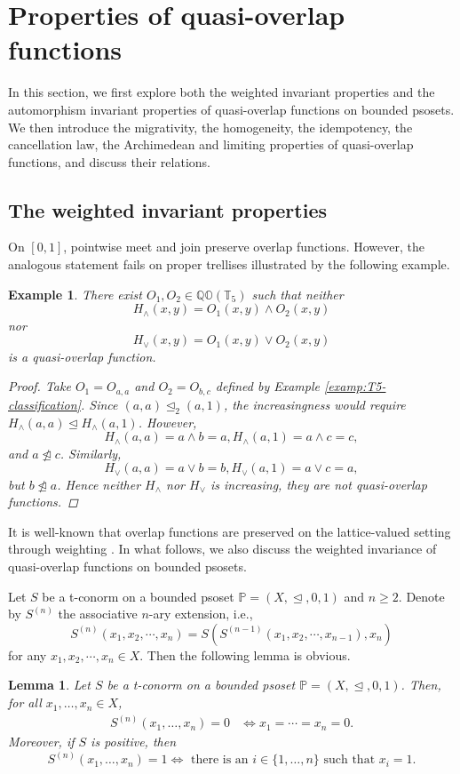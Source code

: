 \documentclass[preprint,12pt]{elsarticle}
\newtheorem{lemma}[theorem]{Lemma}
\newtheorem{example}[theorem]{Example}
\begin{document}
\section{Properties of quasi-overlap functions}\label{sec:properties}
In this section, we first explore both the weighted invariant properties and the automorphism invariant properties of quasi-overlap functions on bounded psosets. We then introduce the migrativity, the homogeneity, the idempotency, the cancellation law, the Archimedean and limiting properties of quasi-overlap functions, and discuss their relations.
\subsection{The weighted invariant properties}

On $[0,1]$, pointwise meet and join preserve overlap functions. However, the analogous statement fails on proper trellises illustrated by the following example.
\begin{example}\label{ex:pointwise-failure}
There exist $O_1,O_2\in\mathbb{QO}(\mathbb{T}_5)$ such that neither
$$
 H_\wedge(x,y)=O_1(x,y)\wedge O_2(x,y)
$$
nor
$$
 H_\vee(x,y)=O_1(x,y)\vee O_2(x,y)
$$
is a quasi-overlap function.

\begin{proof}
Take $O_1=O_{a,a}$ and $O_2=O_{b,c}$ defined by Example \ref{examp:T5-classification}.
Since $(a,a)\trianglelefteq_2(a,1)$, the increasingness would require $H_\wedge(a,a)\trianglelefteq H_\wedge(a,1)$. However,
$$
 H_\wedge(a,a)=a\wedge b=a,
 H_\wedge(a,1)=a\wedge c=c,
$$
and $a\ntrianglelefteq c$. Similarly,
$$
 H_\vee(a,a)=a\vee b=b,
 H_\vee(a,1)=a\vee c=a,
$$
but $b\ntrianglelefteq a$. Hence neither $H_\wedge$ nor $H_\vee$ is increasing, they are not quasi-overlap functions.
\end{proof}
\end{example}

It is well-known that overlap functions are preserved on the lattice-valued setting through weighting \cite{Paiva2021}. In what follows, we also discuss the weighted invariance of quasi-overlap functions on bounded psosets.

Let $S$ be a t-conorm on a bounded psoset $\mathbb{P}=(X,\trianglelefteq,0,1)$ and $n\geq2$. Denote by $S^{(n)}$ the associative $n$-ary extension, i.e., $$S^{(n)}(x_1, x_2, \cdots, x_n)=S(S^{(n-1)}(x_1, x_2, \cdots, x_{n-1}),x_n)$$ for any $x_1, x_2, \cdots, x_n\in X$. Then the following lemma is obvious.
\begin{lemma}\label{lem:nary-boundary}
Let $S$ be a t-conorm on a bounded psoset $\mathbb{P}=(X,\trianglelefteq,0,1)$. Then, for all $x_1,\ldots,x_n\in X$,
$$
\begin{aligned}
 S^{(n)}(x_1,\ldots,x_n)=0
 &\Longleftrightarrow x_1=\cdots=x_n=0.
\end{aligned}
$$
Moreover, if $S$ is positive, then
$$
 S^{(n)}(x_1,\ldots,x_n)=1
 \Longleftrightarrow
 \mbox{ there is an }i\in\{1,\ldots,n\}\mbox{ such that }x_i=1.
$$
\end{lemma}
\end{document}
